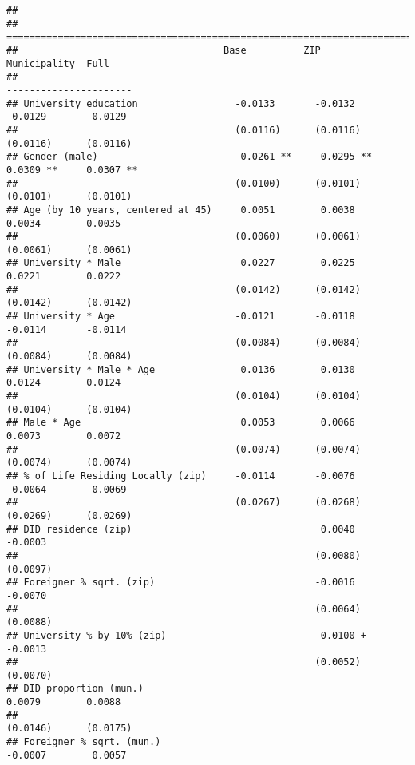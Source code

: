 \documentclass[
]{article}
\begin{document}
\begin{verbatim}
## 
## =========================================================================================
##                                    Base          ZIP           Municipality  Full        
## -----------------------------------------------------------------------------------------
## University education                 -0.0133       -0.0132       -0.0129       -0.0129   
##                                      (0.0116)      (0.0116)      (0.0116)      (0.0116)  
## Gender (male)                         0.0261 **     0.0295 **     0.0309 **     0.0307 **
##                                      (0.0100)      (0.0101)      (0.0101)      (0.0101)  
## Age (by 10 years, centered at 45)     0.0051        0.0038        0.0034        0.0035   
##                                      (0.0060)      (0.0061)      (0.0061)      (0.0061)  
## University * Male                     0.0227        0.0225        0.0221        0.0222   
##                                      (0.0142)      (0.0142)      (0.0142)      (0.0142)  
## University * Age                     -0.0121       -0.0118       -0.0114       -0.0114   
##                                      (0.0084)      (0.0084)      (0.0084)      (0.0084)  
## University * Male * Age               0.0136        0.0130        0.0124        0.0124   
##                                      (0.0104)      (0.0104)      (0.0104)      (0.0104)  
## Male * Age                            0.0053        0.0066        0.0073        0.0072   
##                                      (0.0074)      (0.0074)      (0.0074)      (0.0074)  
## % of Life Residing Locally (zip)     -0.0114       -0.0076       -0.0064       -0.0069   
##                                      (0.0267)      (0.0268)      (0.0269)      (0.0269)  
## DID residence (zip)                                 0.0040                     -0.0003   
##                                                    (0.0080)                    (0.0097)  
## Foreigner % sqrt. (zip)                            -0.0016                     -0.0070   
##                                                    (0.0064)                    (0.0088)  
## University % by 10% (zip)                           0.0100 +                   -0.0013   
##                                                    (0.0052)                    (0.0070)  
## DID proportion (mun.)                                             0.0079        0.0088   
##                                                                  (0.0146)      (0.0175)  
## Foreigner % sqrt. (mun.)                                         -0.0007        0.0057   

\end{verbatim}
\end{document}
